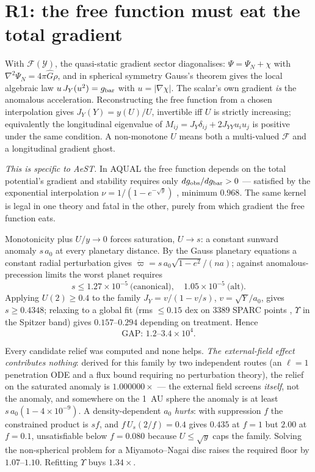 \documentclass[aps,prd,twocolumn,10pt,nofootinbib,superscriptaddress]{revtex4-2}
\newcommand{\FF}{\mathcal{F}}
\newcommand{\YY}{\mathcal{Y}}
\begin{document}
\section{R1: the free function must eat the total gradient}

With $\FF(\YY)$, the quasi-static gradient sector diagonalises: $\Psi=\Psi_N+\chi$ with
$\nabla^2\Psi_N=4\pi\hat G\rho$, and in spherical symmetry Gauss's theorem gives the local
algebraic law $u\,J_Y(u^2)=g_{\rm bar}$ with $u=|\nabla\chi|$. The scalar's own gradient
\emph{is} the anomalous acceleration. Reconstructing the free function from a chosen interpolation
gives $J_Y(Y)=y(U)/U$, invertible iff $U$ is strictly increasing; equivalently the longitudinal
eigenvalue of $M_{ij}=J_Y\delta_{ij}+2J_{YY}u_iu_j$ is positive under the same condition. A
non-monotone $U$ means both a multi-valued $\FF$ and a longitudinal gradient ghost.

\emph{This is specific to AeST.} In AQUAL \cite{BM1984} the free function depends on the total
potential's gradient and stability requires only $dg_{\rm obs}/dg_{\rm bar}>0$ --- satisfied by the
exponential interpolation $\nu=1/(1-e^{-\sqrt y})$ \cite{MS2008}, minimum $0.968$. The same kernel
is legal in one theory and fatal in the other, purely from which gradient the free function eats.

Monotonicity plus $U/y\to0$ forces saturation, $U\to s$: a constant sunward anomaly $s\,a_0$ at
every planetary distance. By the Gauss planetary equations a constant radial perturbation gives
$\dot\varpi=s\,a_0\sqrt{1-e^2}/(na)$; against anomalous-precession limits \cite{Pitjeva,Fienga} the
worst planet requires
\begin{equation}
s\le1.27\times10^{-5}\ \text{(canonical)},\quad 1.05\times10^{-5}\ \text{(alt)}.
\end{equation}
Applying $U(2)\ge0.4$ to the family $J_Y=v/(1-v/s)$, $v=\sqrt{Y}/a_0$, gives $s\ge0.4348$; relaxing
to a global fit (rms $\le0.15$ dex on 3389 SPARC points \cite{SPARC}, $\Upsilon$ in the Spitzer
band) gives $0.157$--$0.294$ depending on treatment. Hence
\begin{equation}
\boxed{\text{GAP: }1.2\text{--}3.4\times10^{4}.}
\end{equation}

Every candidate relief was computed and none helps. \emph{The external-field effect contributes
nothing}: derived for this family by two independent routes (an $\ell=1$ penetration ODE and a flux
bound requiring no perturbation theory), the relief on the saturated anomaly is $1.000000\times$
--- the external field screens \emph{itself}, not the anomaly, and somewhere on the 1~AU sphere the
anomaly is at least $s\,a_0(1-4\times10^{-9})$. A density-dependent $a_0$ \emph{hurts}: with
suppression $f$ the constrained product is $sf$, and $f\,U_s(2/f)=0.4$ gives $0.435$ at $f=1$ but
$2.00$ at $f=0.1$, unsatisfiable below $f=0.080$ because $U\le\sqrt y$ caps the family. Solving the
non-spherical problem for a Miyamoto--Nagai disc raises the required floor by $1.07$--$1.10$.
Refitting $\Upsilon$ buys $1.34\times$.
\end{document}
